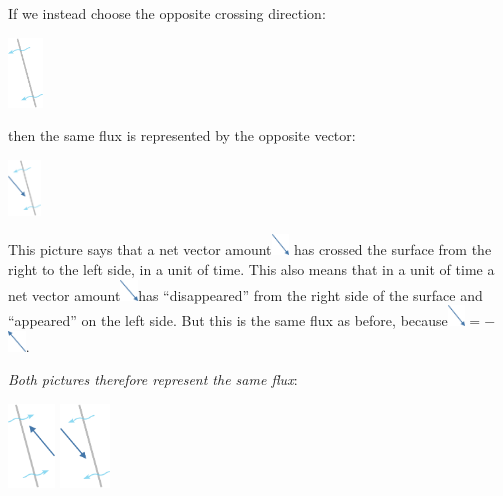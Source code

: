 \documentclass[a4paper,12pt,%
onecolumn,oneside,%
british%
]{memoir}
\renewcommand*{\|}[1][]{\nonscript\:#1\vert\nonscript\:\mathopen{}}
\begin{document}
If we instead choose the opposite crossing direction:\noprelistbreak
\begin{center}
  \medskip
  \includegraphics[height=5em]{images/surface_tilted_crossleft.pdf}
\end{center}
then the same flux is represented by the opposite vector:\noprelistbreak
\begin{center}
  \medskip
  \includegraphics[height=4em]{images/flux_vec_left.pdf}
\end{center}
This picture says that a net vector amount\enspace\includegraphics[align=c,height=1.5em]{images/vec_SE.pdf}\enspace
has crossed the surface from the right to the left side, in a unit of time. This also means that in a unit of time a net vector amount\enspace\includegraphics[align=c,height=1.5em]{images/vec_SE.pdf}\enspace has \enquote{disappeared} from the right side of the surface and \enquote{appeared} on the left side. But this is the same flux as before, because\enspace\includegraphics[align=c,height=1.5em]{images/vec_SE.pdf}${}= -{}$\includegraphics[align=c,height=1.5em]{images/vec_NW.pdf}.

\emph{Both pictures therefore represent the same flux}:\noprelistbreak
\begin{center}\label{fig:vector_fluxes}
  \bigskip
\hspace*{\fill}\includegraphics[align=c,height=6em]{images/flux_vec_right.pdf}
\qquad
\includegraphics[align=c,height=6em]{images/flux_vec_left.pdf}
\hspace*{\fill}
\end{center}
\end{document}
